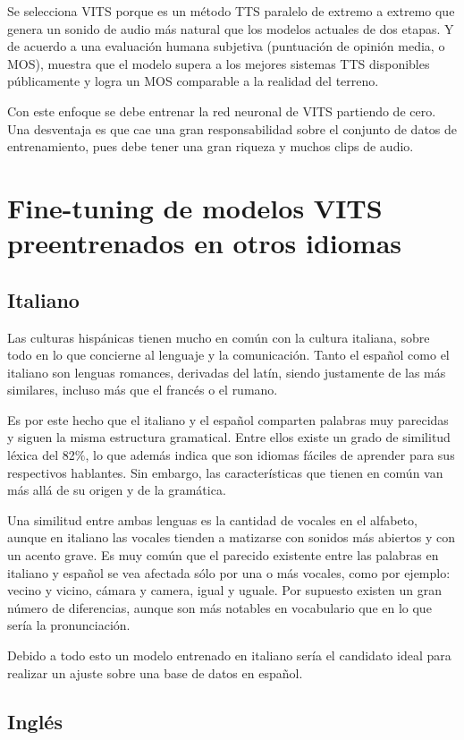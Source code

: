 Se selecciona VITS porque es un método TTS paralelo de extremo a extremo que genera un sonido de audio más natural que los modelos actuales de dos etapas. Y de acuerdo a una evaluación humana subjetiva (puntuación de opinión media, o MOS), muestra que el modelo supera a los mejores sistemas TTS disponibles públicamente y logra un MOS comparable a la realidad del terreno.

Con este enfoque se debe entrenar la red neuronal de VITS partiendo de cero. Una desventaja es que cae una gran responsabilidad sobre el conjunto de datos de entrenamiento, pues debe tener una gran riqueza y muchos clips de audio.
	
	
\section{Fine-tuning de modelos VITS preentrenados en otros idiomas}

\subsection{Italiano}
Las culturas hispánicas tienen mucho en común con la cultura italiana, sobre todo en lo que concierne al lenguaje y la comunicación. Tanto el español como el italiano son lenguas romances, derivadas del latín, siendo justamente de las más similares, incluso más que el francés o el rumano.

Es por este hecho que el italiano y el español comparten palabras muy parecidas y siguen la misma estructura gramatical. Entre ellos existe un grado de similitud léxica del 82$\%$, lo que además indica que son idiomas fáciles de aprender para sus respectivos hablantes. Sin embargo, las características que tienen en común van más allá de su origen y de la gramática.

Una similitud entre ambas lenguas es la cantidad de vocales en el alfabeto, aunque en italiano las vocales tienden a matizarse con sonidos más abiertos y con un acento grave. Es muy común que el parecido existente entre las palabras en italiano y español se vea afectada sólo por una o más vocales, como por ejemplo: vecino y vicino, cámara y camera, igual y uguale. Por supuesto existen un gran número de diferencias, aunque son más notables en vocabulario que en lo que sería la pronunciación. 

Debido a todo esto un modelo entrenado en italiano sería el candidato ideal para realizar un ajuste sobre una base de datos en español. 
\subsection{Inglés}

